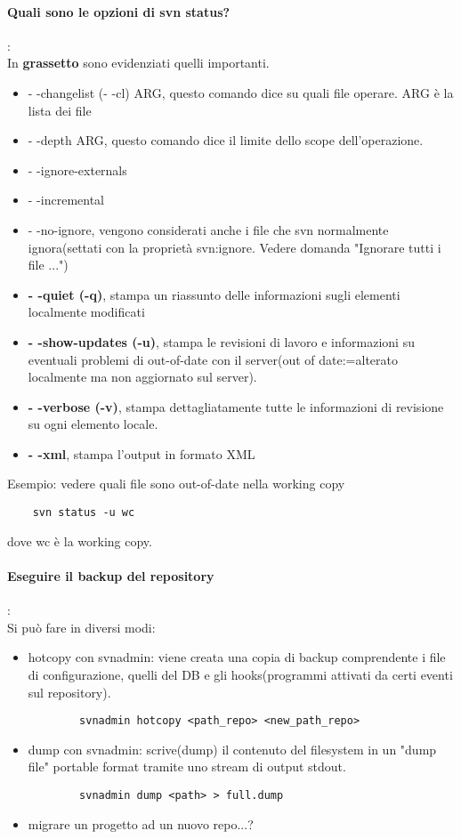\documentclass[a4paper]{article}
\begin{document}
	\paragraph{Quali sono le opzioni di svn status?}: \\
	In \textbf{grassetto} sono evidenziati quelli importanti.
	\begin{itemize}
		
		
		\item - -changelist (- -cl) ARG, questo comando dice su quali file operare. ARG è la lista dei file
		\item - -depth ARG, questo comando dice il limite dello scope dell'operazione.
		\item - -ignore-externals
		\item - -incremental
		\item - -no-ignore, vengono considerati anche i file che svn normalmente ignora(settati con la proprietà svn:ignore. Vedere domanda "Ignorare tutti i file ...")
		\item \textbf{- -quiet (-q)}, stampa un riassunto delle informazioni sugli elementi localmente modificati
		\item \textbf{- -show-updates (-u)}, stampa le revisioni di lavoro e informazioni su eventuali problemi di out-of-date con il server(out of date:=alterato localmente ma non aggiornato sul server).
		\item \textbf{- -verbose (-v)}, stampa dettagliatamente tutte le informazioni di revisione su ogni elemento locale.
		\item \textbf{- -xml}, stampa l'output in formato XML 
		
	\end{itemize}
	Esempio: vedere quali file sono out-of-date nella working copy
	\begin{verbatim}
	svn status -u wc
	\end{verbatim}
	dove wc è la working copy.
	\paragraph{Eseguire il backup del repository}: \\
	Si può fare in diversi modi:
	\begin{itemize}
		\item hotcopy con svnadmin: viene creata una copia di backup comprendente i file di configurazione, quelli del DB e gli hooks(programmi attivati da certi eventi sul repository). \begin{verbatim}
		svnadmin hotcopy <path_repo> <new_path_repo>
		\end{verbatim}
		\item dump con svnadmin: scrive(dump) il contenuto del filesystem in un "dump file" portable format tramite uno stream di output stdout.\begin{verbatim}
		svnadmin dump <path> > full.dump
		\end{verbatim}
		
		\item migrare un progetto ad un nuovo repo...?
		
	\end{itemize}
\end{document}
